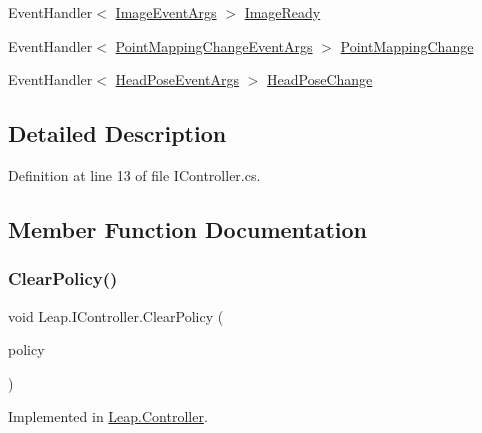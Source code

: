 \begin{DoxyCompactItemize}
\item 
Event\+Handler$<$ \mbox{\hyperlink{class_leap_1_1_image_event_args}{Image\+Event\+Args}} $>$ \mbox{\hyperlink{interface_leap_1_1_i_controller_a1407d879e8e65f00764020fba8f33843}{Image\+Ready}}
\item 
Event\+Handler$<$ \mbox{\hyperlink{class_leap_1_1_point_mapping_change_event_args}{Point\+Mapping\+Change\+Event\+Args}} $>$ \mbox{\hyperlink{interface_leap_1_1_i_controller_ac56b86e0d64e2015d529c8d6e85f1f93}{Point\+Mapping\+Change}}
\item 
Event\+Handler$<$ \mbox{\hyperlink{class_leap_1_1_head_pose_event_args}{Head\+Pose\+Event\+Args}} $>$ \mbox{\hyperlink{interface_leap_1_1_i_controller_a64b663235fc1947beee7da9010c05e34}{Head\+Pose\+Change}}
\end{DoxyCompactItemize}


\subsection{Detailed Description}


Definition at line 13 of file I\+Controller.\+cs.



\subsection{Member Function Documentation}
\mbox{\label{interface_leap_1_1_i_controller_a7aaaef3d250d3b9114a5836d5e470bb3}} 
\subsubsection{\texorpdfstring{ClearPolicy()}{ClearPolicy()}}
{\footnotesize\ttfamily void Leap.\+I\+Controller.\+Clear\+Policy (\begin{DoxyParamCaption}\item[{\mbox{\hyperlink{class_leap_1_1_controller_a0bdb49fa94aa2da8b098c1ac296528d6}{Controller.\+Policy\+Flag}}}]{policy }\end{DoxyParamCaption})}



Implemented in \mbox{\hyperlink{class_leap_1_1_controller_a78edc0a692fa7200a07eee4b651012a4}{Leap.\+Controller}}.

\mbox{\label{interface_leap_1_1_i_controller_a0f8fe519944cc39eae5cf0d3caeaa33c}} 
